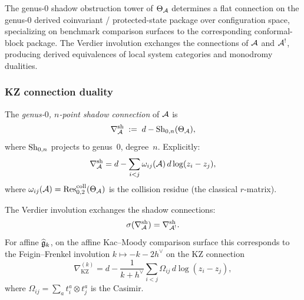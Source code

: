 The genus-$0$ shadow obstruction tower of $\Theta_{\mathcal{A}}$ determines a flat connection
on the genus-$0$ derived coinvariant / protected-state package over
configuration space, specializing on benchmark comparison surfaces to
the corresponding conformal-block package. The Verdier
involution exchanges the connections of $\mathcal{A}$ and $\mathcal{A}^!$, producing
derived equivalences of local system categories and monodromy dualities.

\subsubsection{KZ connection duality}

\begin{definition}
The \emph{genus-$0$, $n$-point shadow connection} of $\mathcal{A}$ is
\begin{equation}%
\nabla^{\mathrm{sh}}_\cA
\;:=\;
d - \Sh_{0,n}(\Theta_\cA),
\end{equation}
where $\mathrm{Sh}_{0,n}$ projects to genus~$0$, degree~$n$. Explicitly:
\begin{equation}%
\nabla^{\mathrm{sh}}_\cA
= d - \sum_{i < j} \omega_{ij}(\cA)\, d\log(z_i - z_j),
\end{equation}
where $\omega_{ij}(\mathcal{A}) = \operatorname{Res}^{\mathrm{coll}}_{0,2}(\Theta_{\mathcal{A}})$
is the collision residue (the classical $r$-matrix).
\end{definition}

\begin{theorem}
\label{thm:thqg-IV-kz-duality}
The Verdier involution exchanges the shadow connections:
\begin{equation}%
\sigma(\nabla^{\mathrm{sh}}_\cA) = \nabla^{\mathrm{sh}}_{\cA^!}.
\end{equation}
For affine $\widehat{\mathfrak{g}}_k$, on the affine Kac--Moody comparison
surface this corresponds to the Feigin--Frenkel involution
$k \mapsto -k - 2h^\vee$ on the KZ connection
\[
\nabla_{\mathrm{KZ}}^{(k)}
= d - \frac{1}{k + h^\vee}
\sum_{i < j} \Omega_{ij}\, d\log(z_i - z_j),
\]
where $\Omega_{ij} = \sum_a t^a_i \otimes t^a_j$ is the Casimir.
\end{theorem}

